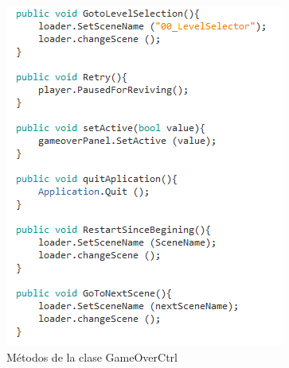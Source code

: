     \begin{figure}[h]
        \centering
        \includegraphics[height=0.2 \textheight]{03TrabajoRealizado/imagenes/GameOverCtrl.png}
        \caption{Métodos de la clase GameOverCtrl}
        \label{fig:GameOverCtrl}
    \end{figure}

